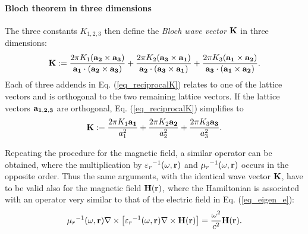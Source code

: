 \paragraph{Bloch theorem in three dimensions} %
The three constants $K_{1,2,3}$ then define the \textit{Bloch wave vector} ${\mathbf{K}}$ in three dimensions: 
\begin{equation} {\mathbf{K}} := 
\frac{2\pi K_1({\mathbf{a_2}}\times{\mathbf{a_3}})}{{\mathbf{a_1}}\cdot({\mathbf{a_2}}\times{\mathbf{a_3}})} +  
\frac{2\pi K_2({\mathbf{a_3}}\times{\mathbf{a_1}})}{{\mathbf{a_2}}\cdot({\mathbf{a_3}}\times{\mathbf{a_1}})} +  
\frac{2\pi K_3({\mathbf{a_1}}\times{\mathbf{a_2}})}{{\mathbf{a_3}}\cdot({\mathbf{a_1}}\times{\mathbf{a_2}})}.
\label{eq_reciprocalK}\end{equation}
Each of three addends in Eq. (\ref{eq_reciprocalK}) relates to one of the lattice vectors and is orthogonal to the two remaining lattice vectors. %
If the lattice vectors ${\mathbf{a_{1,2,3}}}$ are orthogonal, Eq. (\ref{eq_reciprocalK}) simplifies to
\begin{equation} {\mathbf{K}} := 
	\frac{2\pi K_1 {\mathbf{a_1}}}{a_1^{2}} +  
	\frac{2\pi K_2 {\mathbf{a_2}}}{a_2^{2}} +  
	\frac{2\pi K_3 {\mathbf{a_3}}}{a_3^{2}}.
\label{eq_reciprocalKorto}\end{equation}

Repeating the procedure for the magnetic field, a similar operator can be obtained, where the multiplication by ${\varepsilon_r}^{-1}(\omega,{\mathbf{r}})$ and ${\mu_r}^{-1 }(\omega,{\mathbf{r}})$ occurs in the opposite order. Thus the same arguments, with the identical wave vector ${\mathbf{K}}$, have to be valid also for the magnetic field $\mathbf{H}({\mathbf{r}})$, where the Hamiltonian is associated with an operator very similar to that of the electric field in Eq. (\ref{eq_eigen_e}):
\begin{equation}
{\mu_r}^{-1 }(\omega,{\mathbf{r}}) \nabla\times \left[{\varepsilon_r}^{-1}(\omega,{\mathbf{r}}) \nabla\times \mathbf{H}({\mathbf{r}})\right] = \frac{\omega^2}{c^2}\mathbf{H}({\mathbf{r}}).   \label{eq_eigen_h}
\end{equation}

